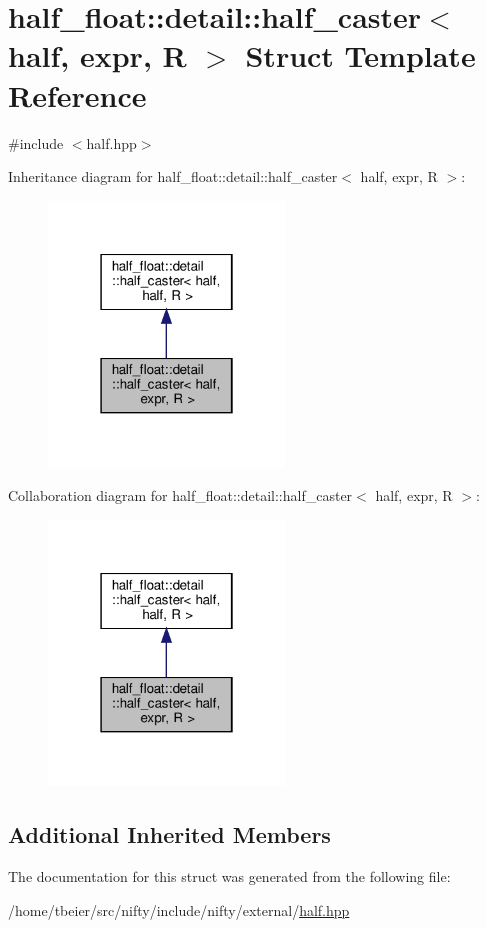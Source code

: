 \hypertarget{structhalf__float_1_1detail_1_1half__caster_3_01half_00_01expr_00_01R_01_4}{}\section{half\+\_\+float\+:\+:detail\+:\+:half\+\_\+caster$<$ half, expr, R $>$ Struct Template Reference}
\label{structhalf__float_1_1detail_1_1half__caster_3_01half_00_01expr_00_01R_01_4}


{\ttfamily \#include $<$half.\+hpp$>$}



Inheritance diagram for half\+\_\+float\+:\+:detail\+:\+:half\+\_\+caster$<$ half, expr, R $>$\+:
\nopagebreak
\begin{figure}[H]
\begin{center}
\leavevmode
\includegraphics[width=178pt]{structhalf__float_1_1detail_1_1half__caster_3_01half_00_01expr_00_01R_01_4__inherit__graph}
\end{center}
\end{figure}


Collaboration diagram for half\+\_\+float\+:\+:detail\+:\+:half\+\_\+caster$<$ half, expr, R $>$\+:
\nopagebreak
\begin{figure}[H]
\begin{center}
\leavevmode
\includegraphics[width=178pt]{structhalf__float_1_1detail_1_1half__caster_3_01half_00_01expr_00_01R_01_4__coll__graph}
\end{center}
\end{figure}
\subsection*{Additional Inherited Members}


The documentation for this struct was generated from the following file\+:\begin{DoxyCompactItemize}
\item 
/home/tbeier/src/nifty/include/nifty/external/\hyperlink{half_8hpp}{half.\+hpp}\end{DoxyCompactItemize}
